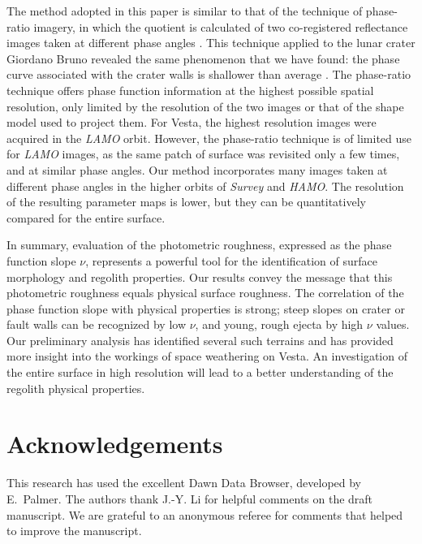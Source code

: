\documentclass[3p,authoryear]{elsarticle}
\begin{document}
The method adopted in this paper is similar to that of the technique of phase-ratio imagery, in which the quotient is calculated of two co-registered reflectance images taken at different phase angles \citep{L92,K11,Li12}. This technique applied to the lunar crater Giordano Bruno revealed the same phenomenon that we have found: the phase curve associated with the crater walls is shallower than average \citep{S12}. The phase-ratio technique offers phase function information at the highest possible spatial resolution, only limited by the resolution of the two images or that of the shape model used to project them. For Vesta, the highest resolution images were acquired in the {\it LAMO} orbit. However, the phase-ratio technique is of limited use for {\it LAMO} images, as the same patch of surface was revisited only a few times, and at similar phase angles. Our method incorporates many images taken at different phase angles in the higher orbits of {\it Survey} and {\it HAMO}. The resolution of the resulting parameter maps is lower, but they can be quantitatively compared for the entire surface.

In summary, evaluation of the photometric roughness, expressed as the phase function slope $\nu$, represents a powerful tool for the identification of surface morphology and regolith properties. Our results convey the message that this photometric roughness equals physical surface roughness. The correlation of the phase function slope with physical properties is strong; steep slopes on crater or fault walls can be recognized by low $\nu$, and young, rough ejecta by high $\nu$ values. Our preliminary analysis has identified several such terrains and has provided more insight into the workings of space weathering on Vesta. An investigation of the entire surface in high resolution will lead to a better understanding of the regolith physical properties.


\section{Acknowledgements}

This research has used the excellent Dawn Data Browser, developed by E.~Palmer. The authors thank J.-Y. Li for helpful comments on the draft manuscript. We are grateful to an anonymous referee for comments that helped to improve the manuscript.



\end{document}
